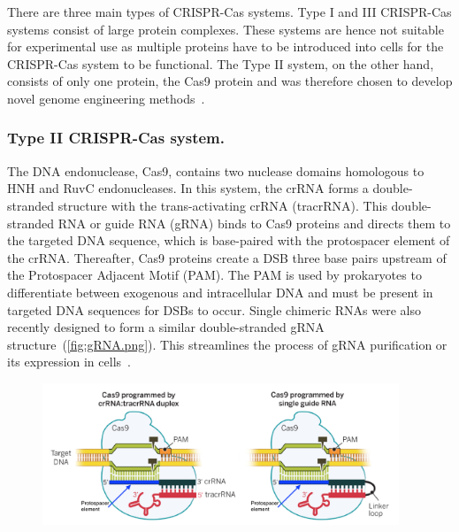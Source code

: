 \documentclass[11pt]{article}
\begin{document}
There are three main types of CRISPR-Cas systems. Type I and III CRISPR-Cas systems consist of large protein complexes. These systems are hence not suitable for experimental use as multiple proteins have to be introduced into cells for the CRISPR-Cas system to be functional. The Type II system, on the other hand, consists of only one protein, the Cas9 protein and was therefore chosen to develop novel genome engineering methods~\citep{Doudna2014, Jinek2012a}.

\subsubsection{Type II CRISPR-Cas system.}
The DNA endonuclease, Cas9, contains two nuclease domains homologous to HNH and RuvC endonucleases. In this system, the crRNA forms a double-stranded structure with the trans-activating crRNA (tracrRNA). This double-stranded RNA or guide RNA (gRNA) binds to Cas9 proteins and directs them to the targeted DNA sequence, which is base-paired with the protospacer element of the crRNA. Thereafter, Cas9 proteins create a DSB three base pairs upstream of the Protospacer Adjacent Motif (PAM). The PAM is used by prokaryotes to differentiate between exogenous and intracellular DNA and must be present in targeted DNA sequences for DSBs to occur. Single chimeric RNAs were also recently designed to form a similar double-stranded gRNA structure~(\autoref{fig:gRNA.png}). This streamlines the process of gRNA purification or its expression in cells~\citep{Jinek2012a}. 

\begin{figure}[H]
  \centering
    \includegraphics[width=0.95\textwidth]{gRNA.png}
    \label{fig:gRNA.png}
\end{figure}
\end{document}

